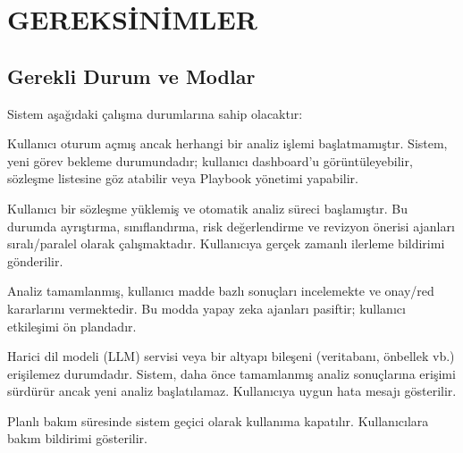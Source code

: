 \documentclass[12pt, a4paper]{article}
\begin{document}
\newpage
\section{GEREKSİNİMLER}

\subsection{Gerekli Durum ve Modlar}

Sistem aşağıdaki çalışma durumlarına sahip olacaktır:

\begin{description}[leftmargin=2cm, style=nextline]
    \item[Boşta (Idle)]
    Kullanıcı oturum açmış ancak herhangi bir analiz işlemi başlatmamıştır. Sistem, yeni görev bekleme durumundadır; kullanıcı dashboard'u görüntüleyebilir, sözleşme listesine göz atabilir veya Playbook yönetimi yapabilir.

    \item[Aktif -- Analiz İşlemi]
    Kullanıcı bir sözleşme yüklemiş ve otomatik analiz süreci başlamıştır. Bu durumda ayrıştırma, sınıflandırma, risk değerlendirme ve revizyon önerisi ajanları sıralı/paralel olarak çalışmaktadır. Kullanıcıya gerçek zamanlı ilerleme bildirimi gönderilir.

    \item[Aktif -- İnceleme ve Karar]
    Analiz tamamlanmış, kullanıcı madde bazlı sonuçları incelemekte ve onay/red kararlarını vermektedir. Bu modda yapay zeka ajanları pasiftir; kullanıcı etkileşimi ön plandadır.

    \item[Bozulmuş (Degraded)]
    Harici dil modeli (LLM) servisi veya bir altyapı bileşeni (veritabanı, önbellek vb.) erişilemez durumdadır. Sistem, daha önce tamamlanmış analiz sonuçlarına erişimi sürdürür ancak yeni analiz başlatılamaz. Kullanıcıya uygun hata mesajı gösterilir.

    \item[Bakım (Maintenance)]
    Planlı bakım süresinde sistem geçici olarak kullanıma kapatılır. Kullanıcılara bakım bildirimi gösterilir.
\end{description}
\end{document}
